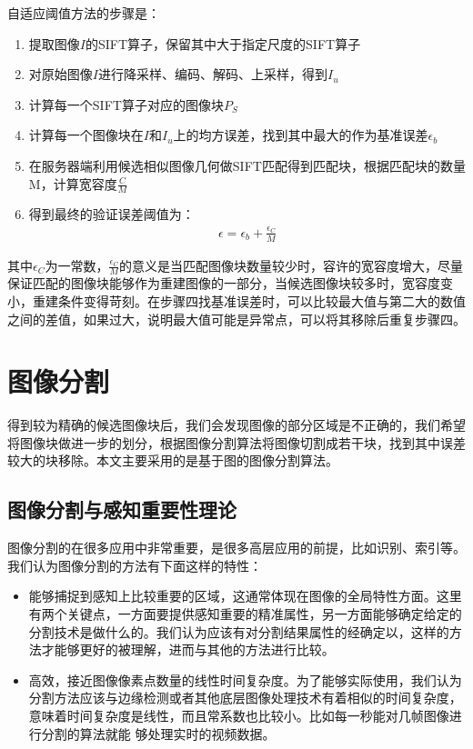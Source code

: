 自适应阈值方法的步骤是：
\begin{enumerate}
\item 提取图像\(I\)的SIFT算子，保留其中大于指定尺度的SIFT算子
\item 对原始图像\(I\)进行降采样、编码、解码、上采样，得到\(I_u\)
\item 计算每一个SIFT算子对应的图像块\(P_S\)
\item 计算每一个图像块在\(I\)和\(I_u\)上的均方误差，找到其中最大的作为基准误差\(\epsilon_b\)
\item 在服务器端利用候选相似图像几何做SIFT匹配得到匹配块，根据匹配块的数量M，计算宽容度\(\frac{C}{M}\)
\item 得到最终的验证误差阈值为：
\begin{align}
\epsilon = \epsilon_b + \frac{\epsilon_C}{M}
\end{align}
\end{enumerate}

其中\(\epsilon_C\)为一常数，\(\frac{\epsilon_C}{M}\)的意义是当匹配图像块数量较少时，容许的宽容度增大，尽量保证匹配的图像块能够作为重建图像的一部分，当候选图像块较多时，宽容度变小，重建条件变得苛刻。在步骤四找基准误差时，可以比较最大值与第二大的数值之间的差值，如果过大，说明最大值可能是异常点，可以将其移除后重复步骤四。

\section{图像分割}

得到较为精确的候选图像块后，我们会发现图像的部分区域是不正确的，我们希望将图像块做进一步的划分，根据图像分割算法将图像切割成若干块，找到其中误差较大的块移除。本文主要采用的是基于图的图像分割算法\cite{Felzenszwalb:2004il}。

\subsection{图像分割与感知重要性理论}

图像分割的在很多应用中非常重要，是很多高层应用的前提，比如识别、索引等。我们认为图像分割的方法有下面这样的特性：
\begin{itemize}
\item 能够捕捉到感知上比较重要的区域，这通常体现在图像的全局特性方面。这里有两个关键点，一方面要提供感知重要的精准属性，另一方面能够确定给定的分割技术是做什么的。我们认为应该有对分割结果属性的经确定以，这样的方法才能够更好的被理解，进而与其他的方法进行比较。
\item 高效，接近图像像素点数量的线性时间复杂度。为了能够实际使用，我们认为分割方法应该与边缘检测或者其他底层图像处理技术有着相似的时间复杂度，意味着时间复杂度是线性，而且常系数也比较小。比如每一秒能对几帧图像进行分割的算法就能
够处理实时的视频数据。
\end{itemize}

